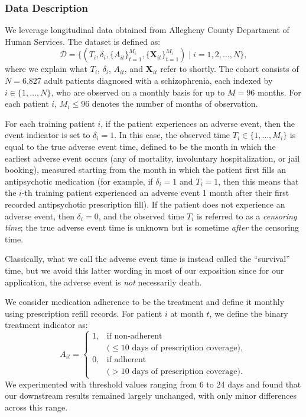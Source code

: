\subsubsection{Data Description}
\label{ch03:sec:methods_data}
We leverage longitudinal data obtained from Allegheny County Department of Human Services.
The dataset is defined as:
\[
\mathcal{D} = \{(T_i, \delta_i, \{A_{it}\}_{t=1}^{M_i}, \{\mathbf{X}_{it}\}_{t=1}^{M_i}) \mid i = 1,2,\dots,N\},
\]
where we explain what $T_i$, $\delta_i$, $A_{it}$, and $\mathbf{X}_{it}$ refer to shortly.
The cohort consists of \(N = \text{6,827}\) adult patients diagnosed with a schizophrenia, each indexed by \(i \in \{1, \dots, N\}\), who are observed on a monthly basis for up to \(M = 96\) months. 
For each patient \(i\), \(M_i \leq 96\) denotes the number of months of observation.

For each training patient \(i\), if the patient experiences an adverse event, then the event indicator is set to $\delta_i = 1$.
In this case, the observed time $T_i\in \{1,\dots,M_i\}$ is equal to the true adverse event time, defined to be the month in which the earliest adverse event occurs (any of mortality, involuntary hospitalization, or jail booking), measured starting from the month in which the patient first fills an antipsychotic medication (for example, if $\delta_i=1$ and $T_i=1$, then this means that the $i$-th training patient experienced an adverse event 1 month after their first recorded antipsychotic prescription fill).
If the patient does not experience an adverse event, then $\delta_i = 0$, and the observed time $T_i$ is referred to as a \emph{censoring time}; the true adverse event time is unknown but is sometime \emph{after} the censoring time.

Classically, what we call the adverse event time is instead called the ``survival'' time, but we avoid this latter wording in most of our exposition since for our application, the adverse event is \emph{not} necessarily death.

We consider medication adherence to be the treatment and define it monthly using prescription refill records.
For patient \(i\) at month \(t\), we define the binary treatment indicator as:
\[
A_{it} =
\begin{cases}
1, & \text{if non-adherent} \\
   & \text{(} \leq\text{10 days of prescription coverage)}, \\
0, & \text{if adherent} \\
   & \text{(} >\text{10 days of prescription coverage)}.
\end{cases}
\]
We experimented with threshold values ranging from 6 to 24 days and found that our downstream results remained largely unchanged, with only minor differences across this range.

